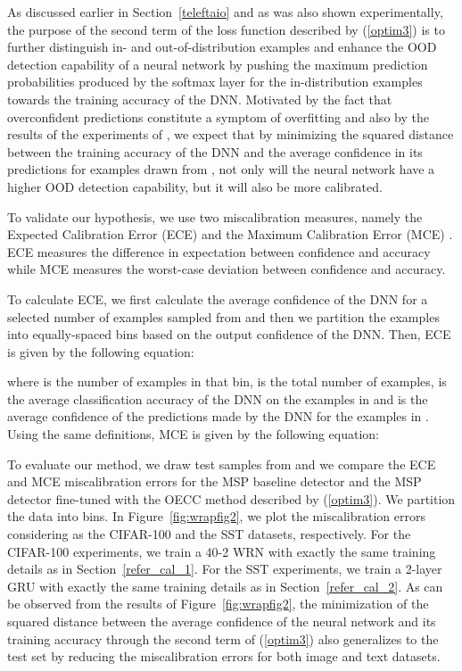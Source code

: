 \documentclass{article} \usepackage{iclr2020_conference,times}
\begin{document}
As discussed earlier in Section~\ref{teleftaio} and as was also shown experimentally, the purpose of the second term of the loss function described by (\ref{optim3}) is to further distinguish in- and out-of-distribution examples and enhance the OOD detection capability of a neural network by pushing the maximum prediction probabilities produced by the softmax layer for the in-distribution examples towards the training accuracy of the DNN. Motivated by the fact that overconfident predictions constitute a symptom of overfitting \citep{DBLP:journals/corr/SzegedyVISW15} and also by the results of the experiments of \citet{Guo:2017:CMN:3305381.3305518}, we expect that by minimizing the squared distance between the training accuracy of the DNN and the average confidence in its predictions for examples drawn from , not only will the neural network have a higher OOD detection capability, but it will also be more calibrated.    

To validate our hypothesis, we use two miscalibration measures, namely the Expected Calibration Error (ECE) and the Maximum Calibration Error (MCE) \citep{Naeini:2015:OWC:2888116.2888120}. ECE measures the difference in expectation between confidence and accuracy while MCE measures the worst-case deviation between confidence and accuracy. 

To calculate ECE, we first calculate the average confidence of the DNN for a selected number of examples  sampled from  and then we partition the examples into equally-spaced bins  based on the output confidence of the DNN. Then, ECE is given by the following equation:

where  is the number of examples in that bin,  is the total number of examples,  is the average classification accuracy of the DNN on the examples in  and  is the average confidence of the predictions made by the DNN for the examples in . Using the same definitions, MCE is given by the following equation:


To evaluate our method, we draw  test samples from  and we compare the ECE and MCE miscalibration errors for the MSP baseline detector \citep{hendrycks17baseline} and the MSP detector fine-tuned with the OECC method described by (\ref{optim3}). We partition the data into  bins. In Figure~\ref{fig:wrapfig2}, we plot the miscalibration errors considering as  the CIFAR-100 and the SST datasets, respectively. For the CIFAR-100 experiments, we train a 40-2 WRN with exactly the same training details as in Section~\ref{refer_cal_1}. For the SST experiments, we train a 2-layer GRU with exactly the same training details as in Section~\ref{refer_cal_2}. As can be observed from the results of Figure~\ref{fig:wrapfig2}, the minimization of the squared distance between the average confidence of the neural network and its training accuracy through the second term of (\ref{optim3}) also generalizes to the test set by reducing the miscalibration errors for both image and text datasets.
\end{document}
